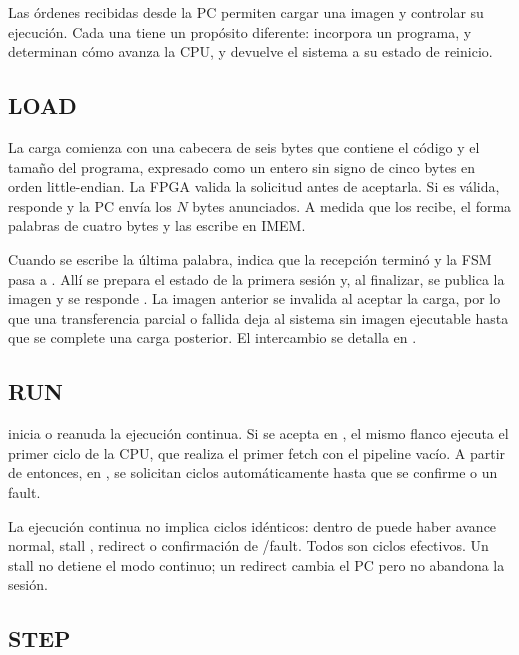Las órdenes recibidas desde la PC permiten cargar una imagen y controlar su
ejecución. Cada una tiene un propósito diferente:  incorpora un
programa,  y  determinan cómo avanza la CPU, y
 devuelve el sistema a su estado de reinicio.

\subsection{LOAD}

La carga comienza con una cabecera de seis bytes que contiene el código
 y el tamaño del programa, expresado como un entero sin signo de
cinco bytes en orden little-endian. La FPGA valida la solicitud antes de
aceptarla. Si es válida, responde  y la PC envía los $N$
bytes anunciados. A medida que los recibe, el  forma palabras de
cuatro bytes y las escribe en IMEM.

Cuando se escribe la última palabra,  indica que la recepción
terminó y la FSM pasa a . Allí se prepara el estado de
la primera sesión y, al finalizar, se publica la imagen y se responde
. La imagen anterior se invalida al aceptar la carga, por lo
que una transferencia parcial o fallida deja al sistema sin imagen ejecutable
hasta que se complete una carga posterior. El intercambio se detalla en
.

\subsection{RUN}

 inicia o reanuda la ejecución continua. Si se acepta en
, el mismo flanco ejecuta el primer ciclo de la CPU, que realiza el
primer fetch con el pipeline vacío. A partir de entonces, en ,
se solicitan ciclos automáticamente hasta que se confirme  o un
fault.

La ejecución continua no implica ciclos idénticos: dentro de 
puede haber avance normal, stall , redirect o confirmación de
/fault. Todos son ciclos efectivos. Un stall no detiene el modo
continuo; un redirect cambia el PC pero no abandona la sesión.

\subsection{STEP}

